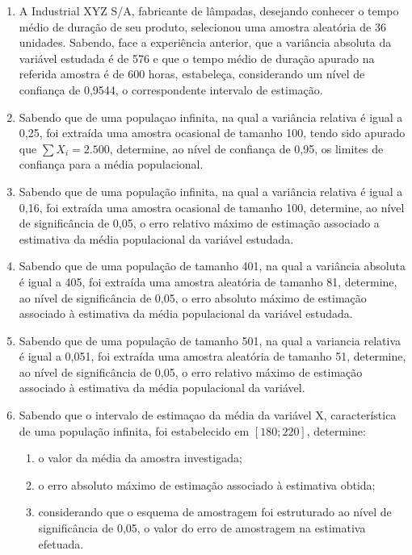 \begin{enumerate}[resume]
\item A Industrial XYZ S/A, fabricante de lâmpadas, desejando conhecer o tempo médio de duração de seu produto, selecionou uma amostra aleatória de 36 unidades. Sabendo, face a experiência anterior, que a variância absoluta da variável estudada é de 576 e que o tempo médio de duração apurado na referida amostra é de 600 horas, estabeleça, considerando um nível de confiança de 0,9544, o correspondente intervalo de estimação.

\item Sabendo que de uma populaçao infinita, na qual a variância relativa é igual a 0,25, foi extraída uma amostra ocasional de tamanho 100, tendo sido apurado que $\sum X_{i}= 2.500$, determine, ao nível de confiança de 0,95, os limites de confiança para a média populacional.

\item Sabendo que de uma população infinita, na qual a variância relativa é igual a 0,16, foi extraída uma amostra ocasional de tamanho 100, determine, ao nível de significância de 0,05, o erro relativo máximo de estimação associado a estimativa da média populacional da variável estudada.

\item Sabendo que de uma população de tamanho 401, na qual a variância absoluta é igual a 405, foi extraída uma amostra aleatória de tamanho 81, determine, ao nível de significância de 0,05, o erro absoluto máximo de estimação associado à estimativa da média populacional da variável estudada.

\item Sabendo que de uma população de tamanho 501, na qual a variancia relativa é igual a 0,051, foi extraída uma amostra aleatória de tamanho 51, determine, ao nível de significância de 0,05, o erro relativo máximo de estimação associado à estimativa da média populacional da variável.

\item Sabendo que o intervalo de estimaçao da média da variável X, característica de uma população infinita, foi estabelecido em $[180 ; 220]$, determine:
	\begin{enumerate}
	\item o valor da média da amostra investigada;
	\item o erro absoluto máximo de estimação associado à estimativa obtida;
	\item considerando que o esquema de amostragem foi estruturado ao nível de significância de 0,05, o valor do erro de amostragem na estimativa efetuada.
	\end{enumerate}


\end{enumerate}
